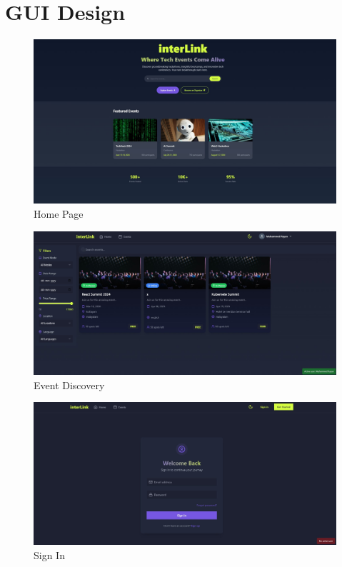\documentclass[twoside,a4paper,openright]{report} %
\begin{document}
\section {GUI Design}
\begin{flushleft}
	\begin{figure}[H]
		\centering
		
		\includegraphics[scale=0.35]{r1.jpg}  
		\caption{Home Page} %
	\end{figure}
	
	\begin{figure}[H]
		\centering
		\includegraphics[scale=0.35]{r2.jpg}   
		\caption{Event Discovery} %
	\end{figure}
	
	\begin{figure}[H]
		\centering
		\includegraphics[scale=0.35]{r3.jpg}   
		\caption{Sign In} %
	\end{figure}
	

\end{flushleft}
\end{document}
